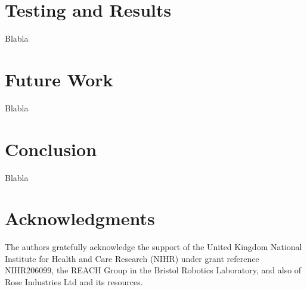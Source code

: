 \documentclass[conference]{IEEEtran}
\begin{document}
\section{Testing and Results}

Blabla

\section{Future Work}

Blabla

\section{Conclusion}

Blabla

\section{Acknowledgments}

The authors gratefully acknowledge the support of the United Kingdom National Institute for Health and Care Research (NIHR) under grant reference NIHR206099, the REACH Group in the Bristol Robotics Laboratory, and also of Rose Industries Ltd and its resources.

\printbibsection
\end{document}
